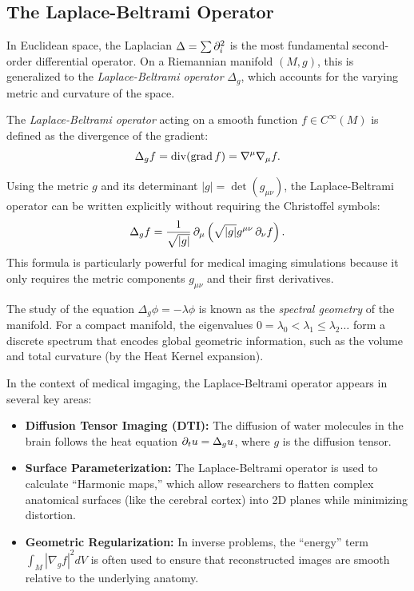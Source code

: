 \subsection{The Laplace-Beltrami Operator}

In Euclidean space, the Laplacian $\Delta = \sum \pd{i}^2$ is the most fundamental second-order differential operator. On a Riemannian manifold $(M, g)$, this is generalized to the \emph{Laplace-Beltrami operator} $\Delta_g$, which accounts for the varying metric and curvature of the space.
\begin{definition}
  The \emph{Laplace-Beltrami operator} acting on a smooth function $f \in C^\infty(M)$ is defined as the divergence of the gradient:
  \begin{equation}
    \Delta_g f = \operatorname{div}(\operatorname{grad} f) = \nabla^\mu \nabla_\mu f
  .\end{equation}
\end{definition}

Using the metric $g$ and its determinant $|g| = \det(g_{\mu\nu})$, the Laplace-Beltrami operator can be written explicitly without requiring the Christoffel symbols:
\begin{equation}
  \Delta_g f = \frac{1}{\sqrt{|g|}} \pd{\mu} \left( \sqrt{|g|} g^{\mu\nu} \pd{\nu} f \right)
.\end{equation}
This formula is particularly powerful for medical imaging simulations because it only requires the metric components $g_{\mu\nu}$ and their first derivatives.

The study of the equation $\Delta_g \phi = -\lambda \phi$ is known as the \emph{spectral geometry} of the manifold. For a compact manifold, the eigenvalues $0 = \lambda_0 < \lambda_1 \leq \lambda_2 \dots$ form a discrete spectrum that encodes global geometric information, such as the volume and total curvature (by the Heat Kernel expansion).

In the context of medical imgaging, the Laplace-Beltrami operator appears in several key areas:
\begin{itemize}
  \item \textbf{Diffusion Tensor Imaging (DTI):} The diffusion of water molecules in the brain follows the heat equation $\pd{t} u = \Delta_g u$, where $g$ is the diffusion tensor.
  \item \textbf{Surface Parameterization:} The Laplace-Beltrami operator is used to calculate ``Harmonic maps,'' which allow researchers to flatten complex anatomical surfaces (like the cerebral cortex) into 2D planes while minimizing distortion.
  \item \textbf{Geometric Regularization:} In inverse problems, the ``energy'' term $\int_M |\nabla_g f|^2 dV$ is often used to ensure that reconstructed images are smooth relative to the underlying anatomy.
\end{itemize}
